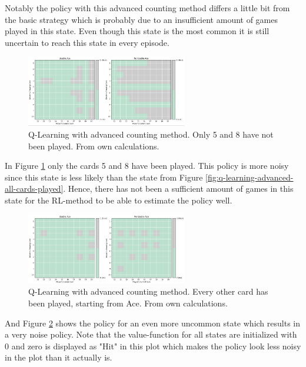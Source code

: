 \documentclass[conference]{IEEEtran}
\begin{document}
Notably the policy with this advanced counting method differs a little bit from the basic strategy which is probably due to an insufficient amount of games played in this state.
Even though this state is the most common it is still uncertain to reach this state in every episode.

\begin{figure}
	\centering
	\includegraphics[width=70mm]{figures/Q-Learning/advanced-counting-10-million/policy-5-8-not-played.png}
	\caption{Q-Learning with advanced counting method. Only 5 and 8 have not been played. From own calculations.}
	\label{fig:q-learning-advanced-5-8-not-played}
\end{figure}

In Figure \ref{fig:q-learning-advanced-5-8-not-played} only the cards 5 and 8 have been played. 
This policy is more noisy since this state is less likely than the state from Figure \ref{fig:q-learning-advanced-all-cards-played}.
Hence, there has not been a sufficient amount of games in this state for the RL-method to be able to estimate the policy well.

\begin{figure}
	\centering
	\includegraphics[width=70mm]{figures/Q-Learning/advanced-counting-10-million/policy-some-cards-played-1010101010.png}
	\caption{Q-Learning with advanced counting method. Every other card has been played, starting from Ace. From own calculations.}
	\label{fig:q-learning-advanced-every-other}
\end{figure}

And Figure \ref{fig:q-learning-advanced-every-other} shows the policy for an even more uncommon state which results in a very noise policy. 
Note that the value-function for all states are initialized with 0 and zero is displayed as "Hit" in this plot which makes the policy look less noisy in the plot than it actually is. 
\end{document}
